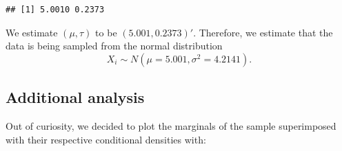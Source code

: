 \documentclass[
  11pt,
]{paper}
\newenvironment{Shaded}{\begin{snugshade}}{\end{snugshade}}
\newcommand{\AttributeTok}[1]{\textcolor[rgb]{0.13,0.29,0.53}{#1}}
\newcommand{\DecValTok}[1]{\textcolor[rgb]{0.00,0.00,0.81}{#1}}
\newcommand{\FloatTok}[1]{\textcolor[rgb]{0.00,0.00,0.81}{#1}}
\newcommand{\FunctionTok}[1]{\textcolor[rgb]{0.13,0.29,0.53}{\textbf{#1}}}
\newcommand{\NormalTok}[1]{#1}
\newcommand{\OtherTok}[1]{\textcolor[rgb]{0.56,0.35,0.01}{#1}}
\newcommand{\SpecialCharTok}[1]{\textcolor[rgb]{0.81,0.36,0.00}{\textbf{#1}}}
\newcommand{\StringTok}[1]{\textcolor[rgb]{0.31,0.60,0.02}{#1}}
\begin{document}
\begin{verbatim}
## [1] 5.0010 0.2373
\end{verbatim}

We estimate \((\mu,\tau)\) to be \((5.001, 0.2373)'\). Therefore, we
estimate that the data is being sampled from the normal distribution
\begin{equation}
  X_i \sim N(\mu=5.001,\sigma^2=4.2141).
\end{equation}

\hypertarget{additional-analysis}{%
\subsection{Additional analysis}\label{additional-analysis}}

Out of curiosity, we decided to plot the marginals of the sample
superimposed with their respective conditional densities with:

\begin{Shaded}
\end{Shaded}
\end{document}
